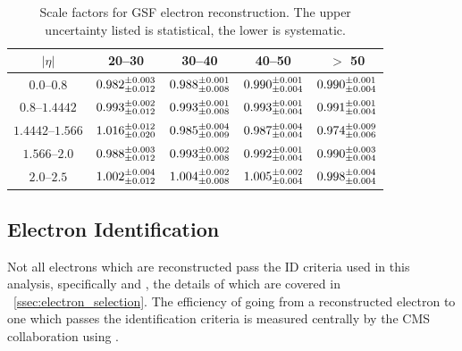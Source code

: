 \begin{table}[h]
\centering
\begin{center}
    \begin{tabular}{ | c | c | c | c | c |} \hline
	$|\eta|$                   & 20--30 \GeV                        & 30--40 \GeV                        & 40--50 \GeV                        & $>$ 50 \GeV                        \\ \hline
	$\numrange{0.0}{0.8}$      & $0.982^{\pm 0.003}_{\pm 0.012}$ & $0.988^{\pm 0.001}_{\pm 0.008}$ & $0.990^{\pm 0.001}_{\pm 0.004}$ & $0.990^{\pm 0.001}_{\pm 0.004}$ \\ \hline
	$\numrange{0.8}{1.4442}$   & $0.993^{\pm 0.002}_{\pm 0.012}$ & $0.993^{\pm 0.001}_{\pm 0.008}$ & $0.993^{\pm 0.001}_{\pm 0.004}$ & $0.991^{\pm 0.001}_{\pm 0.004}$ \\ \hline
	$\numrange{1.4442}{1.566}$ & $1.016^{\pm 0.012}_{\pm 0.020}$ & $0.985^{\pm 0.004}_{\pm 0.009}$ & $0.987^{\pm 0.004}_{\pm 0.004}$ & $0.974^{\pm 0.009}_{\pm 0.006}$ \\ \hline
	$\numrange{1.566}{2.0}$    & $0.988^{\pm 0.003}_{\pm 0.012}$ & $0.993^{\pm 0.002}_{\pm 0.008}$ & $0.992^{\pm 0.001}_{\pm 0.004}$ & $0.990^{\pm 0.003}_{\pm 0.004}$ \\ \hline
	$\numrange{2.0}{2.5}$      & $1.002^{\pm 0.004}_{\pm 0.012}$ & $1.004^{\pm 0.002}_{\pm 0.008}$ & $1.005^{\pm 0.002}_{\pm 0.004}$ & $0.998^{\pm 0.004}_{\pm 0.004}$ \\ \hline
    \end{tabular}
\end{center}
\caption{
    Scale factors for GSF electron reconstruction. The upper uncertainty listed
    is statistical, the lower is systematic.
}
\label{table:gsf_scale_factor}
\end{table}

\subsection{Electron Identification}
\label{ssec:sf_id}

Not all electrons which are reconstructed pass the ID criteria used in this
analysis, specifically \EGMEDIUM and \EGTIGHT, the details of which are covered
in \SEC~\ref{ssec:electron_selection}. The efficiency of going from a
reconstructed electron to one which passes the identification criteria is
measured centrally by the CMS collaboration using \TnP \cite{cms_an_2014-055}.

